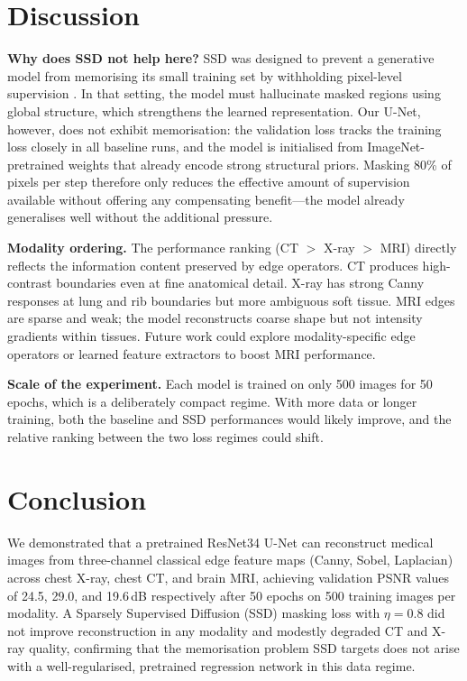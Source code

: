 \documentclass[10pt,twocolumn]{article}
\begin{document}
\section{Discussion}
\label{sec:discussion}

\textbf{Why does SSD not help here?}
SSD was designed to prevent a generative model from memorising its small
training set by withholding pixel-level supervision \cite{ssd2025}.
In that setting, the model must hallucinate masked regions using global
structure, which strengthens the learned representation.
Our U-Net, however, does not exhibit memorisation: the validation loss tracks
the training loss closely in all baseline runs, and the model is initialised
from ImageNet-pretrained weights that already encode strong structural priors.
Masking 80\% of pixels per step therefore only reduces the effective amount of
supervision available without offering any compensating benefit---the
model already generalises well without the additional pressure.

\textbf{Modality ordering.}
The performance ranking (CT $>$ X-ray $>$ MRI) directly reflects the
information content preserved by edge operators.
CT produces high-contrast boundaries even at fine anatomical detail.
X-ray has strong Canny responses at lung and rib boundaries but more ambiguous
soft tissue.
MRI edges are sparse and weak; the model reconstructs coarse shape but not
intensity gradients within tissues.
Future work could explore modality-specific edge operators or learned feature
extractors to boost MRI performance.

\textbf{Scale of the experiment.}
Each model is trained on only 500 images for 50 epochs, which is a
deliberately compact regime.
With more data or longer training, both the baseline and SSD performances would
likely improve, and the relative ranking between the two loss regimes could
shift.

\section{Conclusion}
\label{sec:conclusion}

We demonstrated that a pretrained ResNet34 U-Net can reconstruct medical images
from three-channel classical edge feature maps (Canny, Sobel, Laplacian) across
chest X-ray, chest CT, and brain MRI, achieving validation PSNR values of
24.5, 29.0, and 19.6\,dB respectively after 50 epochs on 500 training images
per modality.
A Sparsely Supervised Diffusion (SSD) masking loss with $\eta=0.8$ did not
improve reconstruction in any modality and modestly degraded CT and X-ray
quality, confirming that the memorisation problem SSD targets does not arise
with a well-regularised, pretrained regression network in this data regime.
\end{document}
